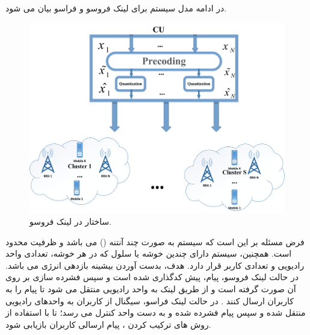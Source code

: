 در ادامه مدل سیستم برای لینک فروسو و فراسو بیان می شود.
\begin{figure}
  \centering
    \includegraphics[width=\linewidth]{./fig/mydraw1}
  \caption{ساختار 
  در  لینک فروسو.
  }
  \label{fig:cr1}
\end{figure}
 فرض مسئله بر این است که سیستم به صورت چند آنتنه ()  می باشد و ظرفیت  محدود است. همچنین، سیستم دارای چندین خوشه یا سلول که در هر خوشه، تعدادی  واحد رادیویی و تعدادی کاربر قرار دارد\cite{EEcluster,jcluster}. هدف، بدست آوردن بیشینه بازدهی انرژی می باشد.\newline
 در حالت لینک فروسو، پیام، پیش کدگذاری شده است و سپس فشرده سازی بر روی آن صورت گرفته است و از طریق لینک  به واحد رادیویی منتقل می شود تا پیام را به کاربران ارسال کنند \cite{Fronthaul, ulSimeone, precodSimeone}
 .\newline
 در حالت لینک فراسو، سیگنال از کاربران به واحدهای رادیویی منتقل شده و سپس پیام فشرده شده و به دست واحد کنترل می رسد؛ تا با استفاده از روش های ترکیب کردن ، پیام ارسالی کاربران بازیابی شود. 

